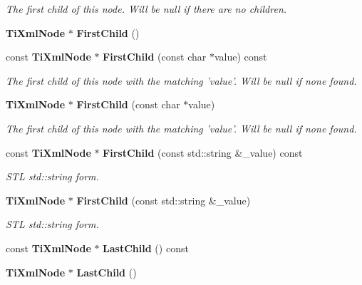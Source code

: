 \begin{CompactItemize}
\begin{CompactList}\small\item\em The first child of this node. Will be null if there are no children. \item\end{CompactList}\item 
{\bf Ti\-Xml\-Node} $\ast$ {\bf First\-Child} ()\label{classTiXmlNode_TiXmlUnknowna15}

\item 
const {\bf Ti\-Xml\-Node} $\ast$ {\bf First\-Child} (const char $\ast$value) const\label{classTiXmlNode_TiXmlUnknowna16}

\begin{CompactList}\small\item\em The first child of this node with the matching 'value'. Will be null if none found. \item\end{CompactList}\item 
{\bf Ti\-Xml\-Node} $\ast$ {\bf First\-Child} (const char $\ast$value)\label{classTiXmlNode_TiXmlUnknowna17}

\begin{CompactList}\small\item\em The first child of this node with the matching 'value'. Will be null if none found. \item\end{CompactList}\item 
const {\bf Ti\-Xml\-Node} $\ast$ {\bf First\-Child} (const std::string \&\_\-value) const\label{classTiXmlNode_TiXmlUnknowna18}

\begin{CompactList}\small\item\em STL std::string form. \item\end{CompactList}\item 
{\bf Ti\-Xml\-Node} $\ast$ {\bf First\-Child} (const std::string \&\_\-value)\label{classTiXmlNode_TiXmlUnknowna19}

\begin{CompactList}\small\item\em STL std::string form. \item\end{CompactList}\item 
const {\bf Ti\-Xml\-Node} $\ast$ {\bf Last\-Child} () const\label{classTiXmlNode_TiXmlUnknowna20}

\item 
{\bf Ti\-Xml\-Node} $\ast$ {\bf Last\-Child} ()\label{classTiXmlNode_TiXmlUnknowna21}


\end{CompactItemize}
